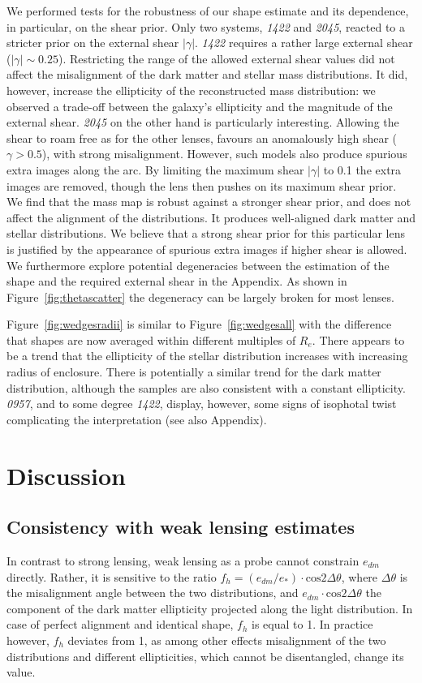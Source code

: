 \documentclass[useAMS,usenatbib]{mn2e}
\begin{document}
We performed tests for the robustness of our shape estimate and its dependence, in particular, on the shear prior. Only two systems, {\it1422} and {\it2045}, reacted to a stricter prior on the external shear $|\gamma|$. {\it1422} requires a rather large external shear ($|\gamma|\sim0.25$). Restricting the range of the allowed external shear values did not affect the misalignment of the dark matter and stellar mass distributions. It did, however, increase the ellipticity of the reconstructed mass distribution: we observed a trade-off between the galaxy's ellipticity and the magnitude of the external shear. {\it2045} on the other hand is particularly interesting. Allowing the shear to roam free as for the other lenses, favours an anomalously high shear ($\gamma > 0.5$), with strong misalignment. However, such models also produce spurious extra images along the arc. By limiting the maximum shear $|\gamma|$ to 0.1 the extra images are removed, though the lens then pushes on its maximum shear prior. We find that the mass map is robust against a stronger shear prior, and does not affect the alignment of the distributions. It produces well-aligned dark matter and stellar distributions. We believe that a strong shear prior for this particular lens is justified by the appearance of spurious extra images if higher shear is allowed. We furthermore explore potential degeneracies between the estimation of the shape and the required external shear in the Appendix. As shown in Figure~\ref{fig:thetascatter} the degeneracy can be largely broken for most lenses.

Figure~\ref{fig:wedgesradii} is similar to Figure~\ref{fig:wedgesall} with the difference that shapes are now averaged within different multiples of $R_e$. There appears to be a trend that the ellipticity of the stellar distribution increases with increasing radius of enclosure. There is potentially a similar trend for the dark matter distribution, although the samples are also consistent with a constant ellipticity. {\it0957}, and to some degree {\it1422}, display, however, some signs of isophotal twist complicating the interpretation (see also Appendix).

\section{Discussion}\label{sec:discussion}

\subsection{Consistency with weak lensing estimates}
In contrast to strong lensing, weak lensing as a probe cannot constrain $e_{dm}$ directly. Rather, it is sensitive to the ratio $f_{h} = (e_{dm}/e_{*})\cdot\mathrm{cos} 2\Delta\theta$, where $\Delta\theta$ is the misalignment angle between the two distributions, and $e_{dm}\cdot\mathrm{cos} 2\Delta\theta$ the component of the dark matter ellipticity projected along the light distribution. In case of perfect alignment and identical shape, $f_{h}$ is equal to 1. In practice however, $f_{h}$ deviates from 1, as among other effects misalignment of the two distributions and different ellipticities, which cannot be disentangled, change its value.
\end{document}
